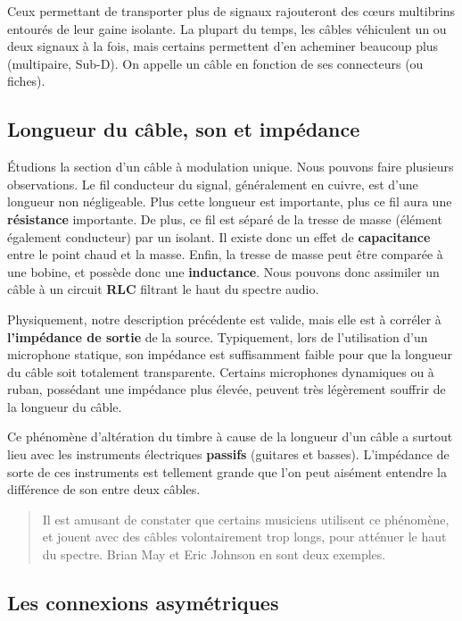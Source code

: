\documentclass[
]{book}
\begin{document}
Ceux permettant de transporter plus de signaux rajouteront des cœurs multibrins entourés de leur gaine isolante. La plupart du temps, les câbles véhiculent un ou deux signaux à la fois, mais certains permettent d'en acheminer beaucoup plus (multipaire, Sub-D). On appelle un câble en fonction de ses connecteurs (ou fiches).

\hypertarget{longueur-du-cuxe2ble-son-et-impuxe9dance}{%
\subsection{Longueur du câble, son et impédance}\label{longueur-du-cuxe2ble-son-et-impuxe9dance}}

Étudions la section d'un câble à modulation unique. Nous pouvons faire plusieurs observations. Le fil conducteur du signal, généralement en cuivre, est d'une longueur non négligeable. Plus cette longueur est importante, plus ce fil aura une \textbf{résistance} importante. De plus, ce fil est séparé de la tresse de masse (élément également conducteur) par un isolant. Il existe donc un effet de \textbf{capacitance} entre le point chaud et la masse. Enfin, la tresse de masse peut être comparée à une bobine, et possède donc une \textbf{inductance}. Nous pouvons donc assimiler un câble à un circuit \textbf{RLC} filtrant le haut du spectre audio.

Physiquement, notre description précédente est valide, mais elle est à corréler à \textbf{l'impédance de sortie} de la source. Typiquement, lors de l'utilisation d'un microphone statique, son impédance est suffisamment faible pour que la longueur du câble soit totalement transparente. Certains microphones dynamiques ou à ruban, possédant une impédance plus élevée, peuvent très légèrement souffrir de la longueur du câble.

Ce phénomène d'altération du timbre à cause de la longueur d'un câble a surtout lieu avec les instruments électriques \textbf{passifs} (guitares et basses). L'impédance de sorte de ces instruments est tellement grande que l'on peut aisément entendre la différence de son entre deux câbles.

\begin{quote}
Il est amusant de constater que certains musiciens utilisent ce phénomène, et jouent avec des câbles volontairement trop longs, pour atténuer le haut du spectre. Brian May et Eric Johnson en sont deux exemples.
\end{quote}

\hypertarget{les-connexions-asymuxe9triques}{%
\subsection{Les connexions asymétriques}\label{les-connexions-asymuxe9triques}}
\end{document}
